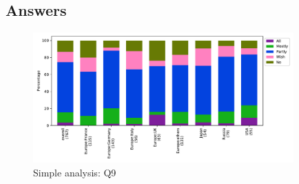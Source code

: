 
\subsection{Answers}


\begin{figure}[htb]
\begin{center}
\includegraphics[width=10cm]{../pdfs/Q9.pdf}
\caption{Simple analysis: Q9}
\label{fig:Q9}
\end{center}
\end{figure}
